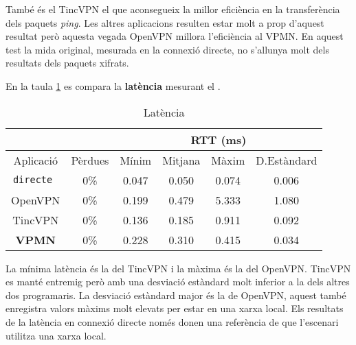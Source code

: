 També és el TincVPN el que aconsegueix la millor eficiència en la transferència dels paquets \emph{ping}. Les altres aplicacions resulten estar molt a prop d'aquest resultat però aquesta vegada OpenVPN millora l'eficiència al VPMN. En aquest test la mida original, mesurada en la connexió directe, no s'allunya molt dels resultats dels paquets xifrats.

En la taula \ref{T:lat} es compara la \textbf{latència} mesurant el .
\begin{table}[htb]
\begin{center}
\begin{tabular}{|c|c|c|c|c|c|}
\multicolumn{2}{c}{} & \multicolumn{4}{|c|}{RTT (ms)} \\ \hline
Aplicació & Pèrdues & Mínim & Mitjana & Màxim & D.Estàndard \\ \hline \hline
\tt directe & 0\% & 0.047 & 0.050 & 0.074 & 0.006 \\ \hline
OpenVPN & 0\% & 0.199 & 0.479 & 5.333 & 1.080 \\ \hline
TincVPN & 0\% & 0.136 & 0.185 & 0.911 & 0.092 \\ \hline
\bf VPMN & 0\% & 0.228 & 0.310 & 0.415 & 0.034 \\ \hline
\end{tabular}
\end{center}
\begin{center}
\caption{Latència}
\label{T:lat}
\end{center}
\end{table}
La mínima latència és la del TincVPN i la màxima és la del OpenVPN. TincVPN es manté entremig però amb una desviació estàndard molt inferior a la dels altres dos programaris. La desviació estàndard major és la de OpenVPN, aquest també enregistra valors màxims molt elevats per estar en una xarxa local. Els resultats de la latència en connexió directe només donen una referència de que l'escenari utilitza una xarxa local.

